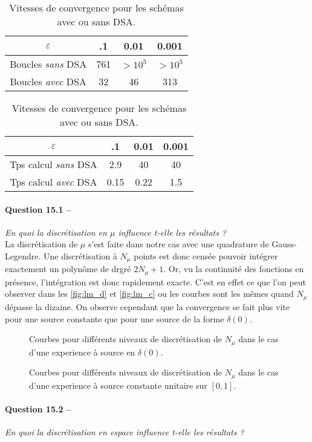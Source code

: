 \documentclass[11pt,a4paper]{article}
\newcommand{\question}[2]{\paragraph{Question #1 --}\hspace{-7pt}\textit{#2} \\}
\begin{document}
\begin{table}
  \centering
  \begin{tabular}{c|ccc}
    $\varepsilon $ & .1 & 0.01 & 0.001 \\
    \hline
    Boucles \textit{sans} DSA & 761 & $>10^5$ & $>10^5$ \\
    Boucles \textit{avec} DSA & 32 & 46 & 313 \\
  \end{tabular}
  \hspace{50pt}
  \begin{tabular}{c|ccc}
    $\varepsilon $ & .1 & 0.01 & 0.001 \\
    \hline
    Tps calcul \textit{sans} DSA & 2.9 & 40 & 40 \\
    Tps calcul \textit{avec} DSA & 0.15 & 0.22 & 1.5 \\
  \end{tabular}
\caption{Vitesses de convergence pour les schémas avec ou sans DSA.}
\label{tab:DSA}
\end{table}


\question{15.1}{En quoi la discrétisation en $\mu$ influence t-elle les résultats ?}

La discrétisation de $\mu$ s'est faite dans notre cas avec une quadrature de Gauss-Legendre. Une discrétisation à $N_\mu$ points est donc censée pouvoir intégrer exactement un polynôme de drgré $2N_\mu+1$. Or, vu la continuité des fonctions en présence, l'intégration est donc rapidement exacte. C'est en effet ce que l'on peut observer dans les \autoref{fig:lm_d} et \autoref{fig:lm_c} ou les courbes sont les mêmes quand $N_\mu$ dépasse la dizaine. On observe cependant que la convergence se fait plus vite pour une source constante que pour une source de la forme $\delta(0)$.
\begin{figure}
  \centering
  
  \caption{Courbes pour différents niveaux de discrétisation de $N_\mu$ dans le cas d'une experience à source en $\delta(0)$.}
  \label{fig:lm_d}
\end{figure}

\begin{figure}
  \centering
  
  \caption{Courbes pour différents niveaux de discrétisation de $N_\mu$ dans le cas d'une experience à source constante unitaire sur $[0,1]$.}
  \label{fig:lm_d}
\end{figure}



\question{15.2}{En quoi la discrétisation en espace influence t-elle les résultats ?}
\end{document}
